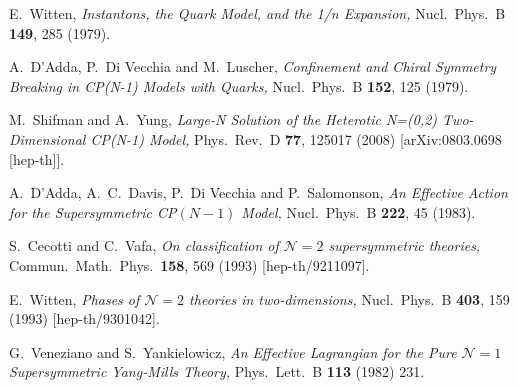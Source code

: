 \documentclass[epsfig,12pt]{article}
\begin{document}
\small
\begin{thebibliography}{99}

E.~Witten,
 {\em Instantons, the Quark Model, and the 1/n Expansion,}
  Nucl.\ Phys.\ B {\bf 149}, 285 (1979).
  
   A.~D'Adda, P.~Di Vecchia and M.~Luscher,
{\em Confinement and Chiral Symmetry Breaking in CP(N-1) Models with Quarks,}
  Nucl.\ Phys.\ B {\bf 152}, 125 (1979).
  
    M.~Shifman and A.~Yung,
{\em Large-N Solution of the Heterotic N=(0,2) Two-Dimensional CP(N-1) Model,}
  Phys.\ Rev.\  D {\bf 77}, 125017 (2008)
  [arXiv:0803.0698 [hep-th]].

  A.~D'Adda, A.~C.~Davis, P.~Di Vecchia and P.~Salomonson,
 {\em An Effective Action for the Supersymmetric {CP}${(N-1)}$ Model,}
  Nucl.\ Phys.\ B {\bf 222}, 45 (1983).
  
    S.~Cecotti and C.~Vafa,
  {\em On classification of ${\mathcal N}=2$ supersymmetric theories,}
  Commun.\ Math.\ Phys.\  {\bf 158}, 569 (1993)
  [hep-th/9211097].
  
      E.~Witten,
{\em Phases of ${\mathcal N}=2$ theories in two-dimensions,}
  Nucl.\ Phys.\ B {\bf 403}, 159 (1993)
  [hep-th/9301042].
  
  
  G.~Veneziano and S.~Yankielowicz,
{\em An Effective Lagrangian for the Pure ${\mathcal N}=1$ Supersymmetric Yang-Mills Theory,}
  Phys.\ Lett.\ B {\bf 113} (1982) 231.
  

\end{thebibliography}
\end{document}
